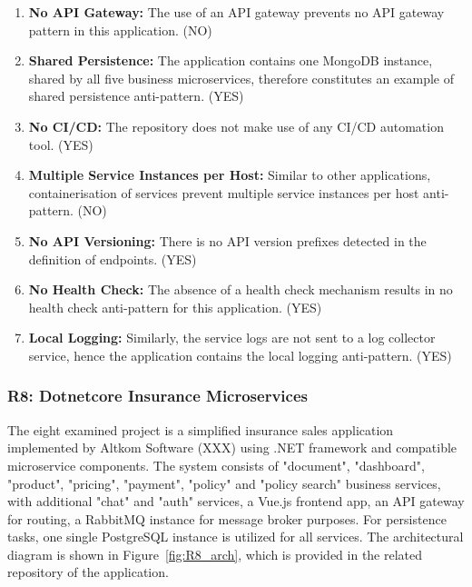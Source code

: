 \documentclass{Configuration_Files/PoliMi3i_thesis}
\begin{document}
\begin{enumerate}
    \item \textbf{No API Gateway:} The use of an API gateway prevents no API gateway pattern in this application. (NO)
    
    \item \textbf{Shared Persistence:} The application contains one MongoDB instance, shared by all five business microservices, therefore constitutes an example of shared persistence anti-pattern. (YES)
    
    \item \textbf{No CI/CD:} The repository does not make use of any CI/CD automation tool. (YES)
    
    \item \textbf{Multiple Service Instances per Host:} Similar to other applications, containerisation of services prevent multiple service instances per host anti-pattern. (NO)
    
    \item \textbf{No API Versioning:} There is no API version prefixes detected in the definition of endpoints. (YES)
    
    \item \textbf{No Health Check:} The absence of a health check mechanism results in no health check anti-pattern for this application. (YES)
    
    \item \textbf{Local Logging:} Similarly, the service logs are not sent to a log collector service, hence the application contains the local logging anti-pattern. (YES)
\end{enumerate}

\subsubsection{R8: Dotnetcore Insurance Microservices}
\label{subsubsec:R8}

The eight examined project is a simplified insurance sales application implemented by Altkom Software (XXX) using .NET framework and compatible microservice components.
The system consists of "document", "dashboard", "product", "pricing", "payment", "policy" and "policy search" business services, with additional "chat" and "auth" services, a Vue.js frontend app, an API gateway for routing, a RabbitMQ instance for message broker purposes.
For persistence tasks, one single PostgreSQL instance is utilized for all services.
The architectural diagram is shown in Figure~\ref{fig:R8_arch}, which is provided in the related repository of the application.
\end{document}
